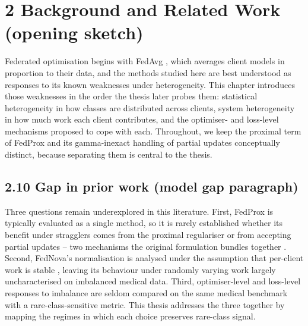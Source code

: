 \section*{2 Background and Related Work (opening sketch)}
Federated optimisation begins with FedAvg \citep{mcmahan2017fedavg}, which
averages client models in proportion to their data, and the methods studied here
are best understood as responses to its known weaknesses under heterogeneity.
This chapter introduces those weaknesses in the order the thesis later probes
them: statistical heterogeneity in how classes are distributed across clients,
system heterogeneity in how much work each client contributes, and the
optimiser- and loss-level mechanisms proposed to cope with each. Throughout, we
keep the proximal term of FedProx and its gamma-inexact handling of partial
updates conceptually distinct, because separating them is central to the thesis.


\subsection*{2.10 Gap in prior work (model gap paragraph)}
Three questions remain underexplored in this literature. First, FedProx is
typically evaluated as a single method, so it is rarely established whether its
benefit under stragglers comes from the proximal regulariser or from accepting
partial updates -- two mechanisms the original formulation bundles together
\citep{li2020fedprox}. Second, FedNova's normalisation is analysed under the
assumption that per-client work is stable \citep{wang2020fednova}, leaving its
behaviour under randomly varying work largely uncharacterised on imbalanced
medical data. Third, optimiser-level and loss-level responses to imbalance are
seldom compared on the same medical benchmark with a rare-class-sensitive metric.
This thesis addresses the three together by mapping the regimes in which each
choice preserves rare-class signal.


